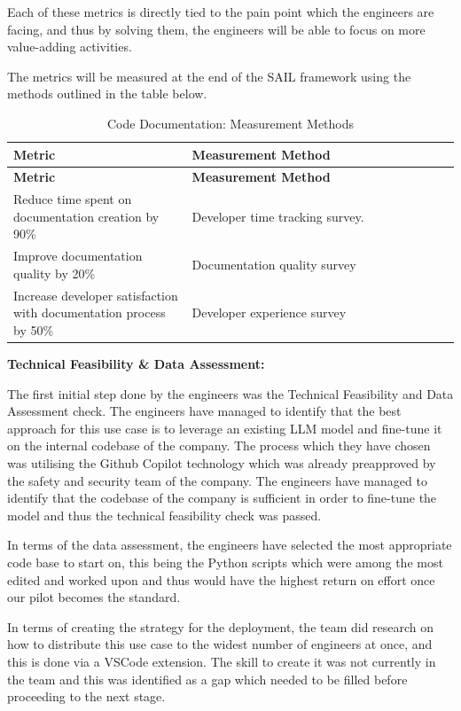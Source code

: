 \documentclass[]{imc-inf}
\begin{document}
Each of these metrics is directly tied to the pain point which the engineers are facing, and thus by solving them, the engineers will be able to focus on more value-adding activities.

The metrics will be measured at the end of the SAIL framework using the methods outlined in the table below.

\begin{longtable}{|p{0.4\linewidth}|p{0.6\linewidth}|}
	\hline
	\textbf{Metric} & \textbf{Measurement Method} \\
	\hline
	\endfirsthead
	\hline
	\textbf{Metric} & \textbf{Measurement Method} \\
	\hline
	\endhead
	\hline
	\caption{Code Documentation: Measurement Methods}
	\label{tab:doc_gen_metrics}
	\endlastfoot
	
	Reduce time spent on documentation creation by 90\% &
	Developer time tracking survey. \\
	\hline
	
	Improve documentation quality by 20\% &
	Documentation quality survey\\
	\hline
	
	Increase developer satisfaction with documentation process by 50\% &
	Developer experience survey \\
	\hline

\end{longtable}


\textbf{Technical Feasibility \& Data Assessment:}

The first initial step done by the engineers was the Technical Feasibility and Data Assessment check. The engineers have managed to identify that the best approach for this use case is to leverage an existing LLM model and fine-tune it on the internal codebase of the company. The process which they have chosen was utilising the Github Copilot technology which was already preapproved by the safety and security team of the company. The engineers have managed to identify that the codebase of the company is sufficient in order to fine-tune the model and thus the technical feasibility check was passed. 

In terms of the data assessment, the engineers have selected the most appropriate code base to start on, this being the Python scripts which were among the most edited and worked upon and thus would have the highest return on effort once our pilot becomes the standard.

In terms of creating the strategy for the deployment, the team did research on how to distribute this use case to the widest number of engineers at once, and this is done via a VSCode extension. The skill to create it was not currently in the team and this was identified as a gap which needed to be filled before proceeding to the next stage.
\end{document}
